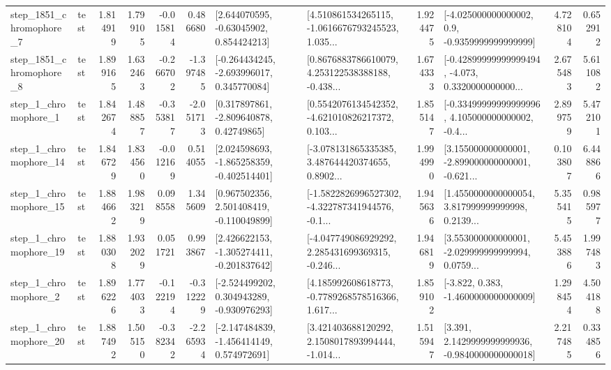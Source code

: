 \begin{tabular}{llrrrrllrlrr}
  step\_1851\_chromophore\_7 &      test &      1.814919 &    1.799105 &     -0.015814 &  0.486680 &     [2.644070595, -0.63045902, 0.854424213] &  [4.510861534265115, -1.0616676793245523, 1.035... &       1.924475 &     [-4.025000000000002, 0.9, -0.9359999999999999] &            4.728104 &          0.652912 \\
  step\_1851\_chromophore\_8 &      test &      1.899165 &    1.632463 &     -0.266702 & -1.397485 &   [-0.264434245, -2.693996017, 0.345770084] &  [0.8676883786610079, 4.253122538388188, -0.438... &       1.674333 &  [-0.42899999999999494, -4.073, 0.3320000000000... &            2.675483 &          5.611082 \\
     step\_1\_chromophore\_1 &      test &      1.842674 &    1.488857 &     -0.353817 & -2.051713 &     [0.317897861, -2.809640878, 0.42749865] &  [0.5542076134542352, -4.621010826217372, 0.103... &       1.855147 &  [-0.33499999999999996, 4.105000000000002, -0.4... &            2.899759 &          5.472101 \\
    step\_1\_chromophore\_14 &      test &      1.846729 &    1.834560 &     -0.012169 &  0.514055 &   [2.024598693, -1.865258359, -0.402514401] &  [-3.078131865335385, 3.487644420374655, 0.8902... &       1.994990 &  [3.155000000000001, -2.899000000000001, -0.621... &            0.103807 &          6.448866 \\
    step\_1\_chromophore\_15 &      test &      1.884662 &    1.983219 &      0.098558 &  1.345609 &    [0.967502356, 2.501408419, -0.110049899] &  [-1.5822826996527302, -4.322787341944576, -0.1... &       1.945636 &  [1.4550000000000054, 3.817999999999998, 0.2139... &            5.355415 &          0.985977 \\
    step\_1\_chromophore\_19 &      test &      1.880308 &    1.932029 &      0.051721 &  0.993867 &   [2.426622153, -1.305274411, -0.201837642] &  [-4.047749086929292, 2.285431699369315, -0.246... &       1.946819 &  [3.553000000000001, -2.029999999999994, 0.0759... &            5.453886 &          1.997483 \\
     step\_1\_chromophore\_2 &      test &      1.896226 &    1.774033 &     -0.122194 & -0.312229 &   [-2.524499202, 0.304943289, -0.930976293] &  [4.185992608618773, -0.7789268578516366, 1.617... &       1.859102 &               [-3.822, 0.383, -1.4600000000000009] &            1.298454 &          4.504188 \\
    step\_1\_chromophore\_20 &      test &      1.887492 &    1.505150 &     -0.382342 & -2.265934 &   [-2.147484839, -1.456414149, 0.574972691] &  [3.421403688120292, 2.1508017893994444, -1.014... &       1.515947 &   [3.391, 2.1429999999999936, -0.9840000000000018] &            2.217485 &          0.334856 \\

\end{tabular}
